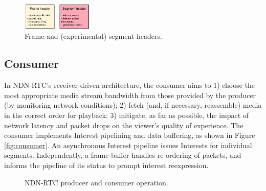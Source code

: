 \documentclass{icn/sig-alternate-2013} %
\newcommand{\ndnrtcName}{NDN-RTC} %
\begin{document}
\begin{figure}[t!]
\centering
\includegraphics[width=0.3\textwidth]{data-struct}
\vspace{-4pt}
\caption{Frame and (experimental) segment headers.}
\label{fig:data-struct}
\end{figure}


\subsection{Consumer}
\label{sec:consumer}

In \ndnrtcName{}'s receiver-driven architecture, the consumer aims to 1) choose the most appropriate media stream bandwidth from those provided by the producer (by monitoring network conditions); 2) fetch (and, if necessary, reassemble) media in the correct order for playback; 3) mitigate, as far as possible, the impact of network latency and packet drops on the viewer's quality of experience.  
The consumer implements Interest pipelining and data buffering, as shown in Figure \ref{fig:consumer}. An asynchronous Interest pipeline issues Interests for individual segments. Independently, a frame buffer handles re-ordering of packets, and informs the pipeline of its status to prompt interest reexpression.

\begin{figure}[t!]
\centering
{}\qquad
{}
\caption{\ndnrtcName{} producer and consumer operation.}
\end{figure}
\end{document}
